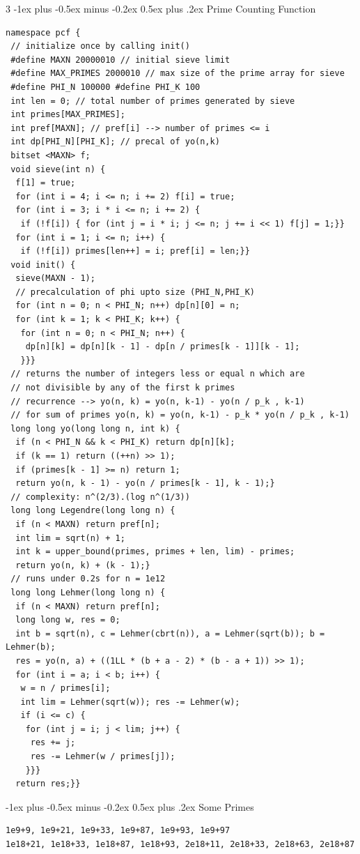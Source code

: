 \documentclass[8pt,a4paper,onesided]{article}
\makeatletter
\renewcommand{\subsection}{\@startsection{subsection}{2}{0mm}
    {-1ex plus -0.5ex minus -0.2ex} %
    {0.5ex plus .2ex}                %
    {\normalfont\large\bfseries}}    %
\makeatother
\begin{document}
\begin{multicols}{3}
\subsection{Prime Counting Function}
\begin{verbatim}
namespace pcf {
 // initialize once by calling init()
 #define MAXN 20000010 // initial sieve limit
 #define MAX_PRIMES 2000010 // max size of the prime array for sieve
 #define PHI_N 100000 #define PHI_K 100
 int len = 0; // total number of primes generated by sieve
 int primes[MAX_PRIMES];
 int pref[MAXN]; // pref[i] --> number of primes <= i
 int dp[PHI_N][PHI_K]; // precal of yo(n,k)
 bitset <MAXN> f;
 void sieve(int n) {
  f[1] = true;
  for (int i = 4; i <= n; i += 2) f[i] = true;
  for (int i = 3; i * i <= n; i += 2) {
   if (!f[i]) { for (int j = i * i; j <= n; j += i << 1) f[j] = 1;}}
  for (int i = 1; i <= n; i++) {
   if (!f[i]) primes[len++] = i; pref[i] = len;}}
 void init() {
  sieve(MAXN - 1);
  // precalculation of phi upto size (PHI_N,PHI_K)
  for (int n = 0; n < PHI_N; n++) dp[n][0] = n;
  for (int k = 1; k < PHI_K; k++) {
   for (int n = 0; n < PHI_N; n++) {
    dp[n][k] = dp[n][k - 1] - dp[n / primes[k - 1]][k - 1];
   }}}
 // returns the number of integers less or equal n which are
 // not divisible by any of the first k primes
 // recurrence --> yo(n, k) = yo(n, k-1) - yo(n / p_k , k-1)
 // for sum of primes yo(n, k) = yo(n, k-1) - p_k * yo(n / p_k , k-1)
 long long yo(long long n, int k) {
  if (n < PHI_N && k < PHI_K) return dp[n][k];
  if (k == 1) return ((++n) >> 1);
  if (primes[k - 1] >= n) return 1;
  return yo(n, k - 1) - yo(n / primes[k - 1], k - 1);}
 // complexity: n^(2/3).(log n^(1/3))
 long long Legendre(long long n) {
  if (n < MAXN) return pref[n];
  int lim = sqrt(n) + 1;
  int k = upper_bound(primes, primes + len, lim) - primes;
  return yo(n, k) + (k - 1);}
 // runs under 0.2s for n = 1e12
 long long Lehmer(long long n) {
  if (n < MAXN) return pref[n];
  long long w, res = 0;
  int b = sqrt(n), c = Lehmer(cbrt(n)), a = Lehmer(sqrt(b)); b = Lehmer(b);
  res = yo(n, a) + ((1LL * (b + a - 2) * (b - a + 1)) >> 1);
  for (int i = a; i < b; i++) {
   w = n / primes[i];
   int lim = Lehmer(sqrt(w)); res -= Lehmer(w);
   if (i <= c) {
    for (int j = i; j < lim; j++) {
     res += j;
     res -= Lehmer(w / primes[j]);
    }}}
  return res;}}
\end{verbatim}
\subsection{Some Primes}
\begin{verbatim}
1e9+9, 1e9+21, 1e9+33, 1e9+87, 1e9+93, 1e9+97
1e18+21, 1e18+33, 1e18+87, 1e18+93, 2e18+11, 2e18+33, 2e18+63, 2e18+87
\end{verbatim}

\end{multicols}
\end{document}

